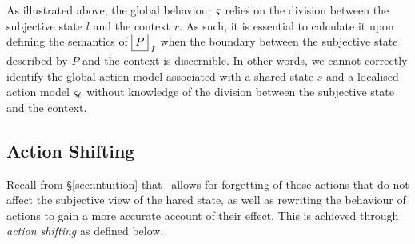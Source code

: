 %
As illustrated above, the global behaviour $\varsigma_{}$ relies on the division between the subjective state $l$ and the context $r$. As such, it is essential to calculate it upon defining the semantics of $\shared{P}{I}$ when the boundary between the subjective state described by $P$ and the context is discernible.  In other words, we cannot correctly identify the global action model associated with  a shared state $s$ and a localised action model $\varsigma_{\ell}$ without knowledge of the division between the subjective state and the context. 

%
%
%
\subsection{Action Shifting}
Recall from \S\ref{sec:intuition} that \colosl\ allows for forgetting of those  actions that do not affect the subjective view of the hared state, as well as rewriting the behaviour of actions to gain a more accurate account of their effect. This is achieved through \emph{action shifting} as defined below.
%
